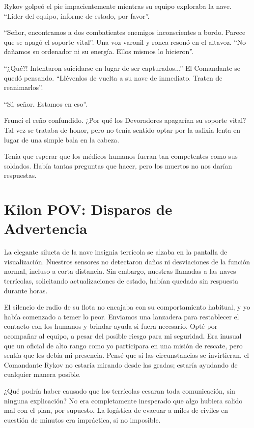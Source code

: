 \documentclass[spanish,12pt,a4paper,oneside,titlepage]{book}
\begin{document}
    Rykov golpeó el pie impacientemente mientras su equipo exploraba la nave. ``Líder del equipo, informe de estado, por favor''.

    ``Señor, encontramos a dos combatientes enemigos inconscientes a bordo. Parece que se apagó el soporte vital''. Una voz varonil y ronca resonó en el altavoz. ``No dañamos su ordenador ni su energía. Ellos mismos lo hicieron''.

    ``¿Qué?! Intentaron suicidarse en lugar de ser capturados...'' El Comandante se quedó pensando. ``Llévenlos de vuelta a su nave de inmediato. Traten de reanimarlos''.

    ``Sí, señor. Estamos en eso''.

    Fruncí el ceño confundido. ¿Por qué los Devoradores apagarían su soporte vital? Tal vez se trataba de honor, pero no tenía sentido optar por la asfixia lenta en lugar de una simple bala en la cabeza.

    Tenía que esperar que los médicos humanos fueran tan competentes como sus soldados. Había tantas preguntas que hacer, pero los muertos no nos darían respuestas.

    \chapter{Kilon POV: Disparos de Advertencia}

    La elegante silueta de la nave insignia terrícola se alzaba en la pantalla de visualización. Nuestros sensores no detectaron daños ni desviaciones de la función normal, incluso a corta distancia. Sin embargo, nuestras llamadas a las naves terrícolas, solicitando actualizaciones de estado, habían quedado sin respuesta durante horas.

    El silencio de radio de su flota no encajaba con su comportamiento habitual, y yo había comenzado a temer lo peor. Enviamos una lanzadera para restablecer el contacto con los humanos y brindar ayuda si fuera necesario. Opté por acompañar al equipo, a pesar del posible riesgo para mi seguridad. Era inusual que un oficial de alto rango como yo participara en una misión de rescate, pero sentía que les debía mi presencia. Pensé que si las circunstancias se invirtieran, el Comandante Rykov no estaría mirando desde las gradas; estaría ayudando de cualquier manera posible.

    ¿Qué podría haber causado que los terrícolas cesaran toda comunicación, sin ninguna explicación? No era completamente inesperado que algo hubiera salido mal con el plan, por supuesto. La logística de evacuar a miles de civiles en cuestión de minutos era impráctica, si no imposible.
\end{document}
